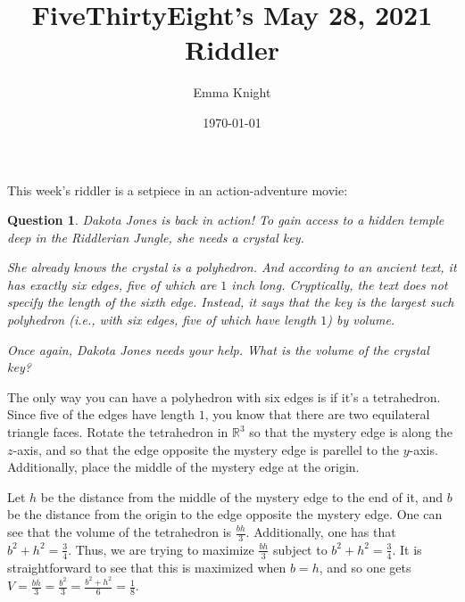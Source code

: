 \documentclass[11pt]{article}
\title{FiveThirtyEight's May 28, 2021 Riddler}
\author{Emma Knight}
\date{\today}
\newtheorem{question}[theorem]{Question}
\theoremstyle{definition}
\newcommand{\R}{\mathbb{R}}
\begin{document}
\maketitle

This week's riddler is a setpiece in an action-adventure movie:
\begin{question}
Dakota Jones is back in action! To gain access to a hidden temple deep in the Riddlerian Jungle, she needs a crystal key.

She already knows the crystal is a polyhedron. And according to an ancient text, it has exactly six edges, five of which are $1$ inch long. Cryptically, the text does not specify the length of the sixth edge. Instead, it says that the key is the largest such polyhedron (i.e., with six edges, five of which have length $1$) by volume.

Once again, Dakota Jones needs your help. What is the volume of the crystal key?
\end{question}

The only way you can have a polyhedron with six edges is if it's a tetrahedron.  Since five of the edges have length $1$, you know that there are two equilateral triangle faces.  Rotate the tetrahedron in $\R^3$ so that the mystery edge is along the $z$-axis, and so that the edge opposite the mystery edge is parellel to the $y$-axis.  Additionally, place the middle of the mystery edge at the origin.

Let $h$ be the distance from the middle of the mystery edge to the end of it, and $b$ be the distance from the origin to the edge opposite the mystery edge.  One can see that the volume of the tetrahedron is $\frac{bh}{3}$.  Additionally, one has that $b^2 + h^2 = \frac{3}{4}$.  Thus, we are trying to maximize $\frac{bh}{3}$ subject to $b^2 + h^2 = \frac{3}{4}$.  It is straightforward to see that this is maximized when $b = h$, and so one gets $V = \frac{bh}{3} = \frac{b^2}{3}= \frac{b^2 + h^2}{6}= \frac{1}{8}$.
\end{document}
